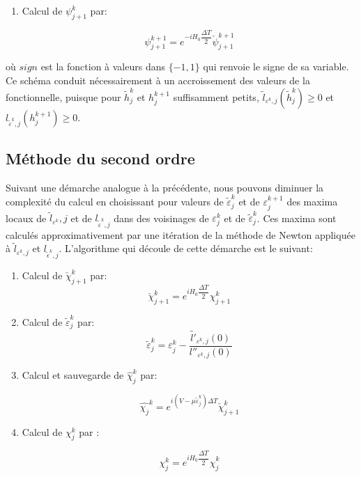 \begin{itemize}
\begin{enumerate}
	\item Calcul de $\psi_{j+1}^k$ par: 
	
	$$\psi_{j+1}^{k+1} = e^{-i H_0 \dfrac{\Delta T}{2}} \check{\psi}_{j+1}^{k+1}$$
	
\end{enumerate}
\end{itemize}

où $sign$ est la fonction à valeurs dans $\{-1,1\}$ qui renvoie le signe de sa variable. Ce schéma conduit nécessairement à un accroissement des valeurs de la fonctionnelle, puisque pour $\tilde{h}_j^k$ et $h_j^{k+1}$ suffisamment petits, $\tilde{l}_{\varepsilon^k,j}(\tilde{h}_j^k) \geq 0$ et $l_{\tilde{\varepsilon}^k,j}(h_j^{k+1})\geq0$.


\subsection{Méthode du second ordre}

Suivant une démarche analogue à la précédente, nous pouvons diminuer la complexité du calcul en choisissant pour valeurs de $\tilde{\varepsilon}_j^k$ et de $\varepsilon_j^{k+1}$ des maxima locaux de $\tilde{l}_{\varepsilon^k},j$ et de $l_{\tilde{\varepsilon}^k,j}$ dans des voisinages de $\varepsilon_j^k$ et de $\tilde{\varepsilon}_j^k$. Ces maxima sont calculés approximativement par une itération de la méthode de Newton appliquée à $\tilde{l}_{\varepsilon^k, j}$ et $l_{\tilde{\epsilon}^k,j}$. L'algorithme qui découle de cette démarche est le suivant:

\begin{enumerate}
	\item Calcul de $\check{\chi}_{j+1}^k$ par: $$ \check{\chi}_{j+1}^k = e^{iH_0 \dfrac{\Delta T}{2}} \chi_{j+1}^k$$
	
	
	\item Calcul de $\tilde{\varepsilon}_j^k$ par: $$\tilde{\varepsilon}_j^k = \varepsilon_j^k - \dfrac{\tilde{l'}_{\varepsilon^k,j}(0)}{l''_{\varepsilon^k,j}(0)}$$
	
	\item Calcul et sauvegarde de $\widehat{\chi}_j^k$ par:
	
	$$\widehat{\chi_j}^k = e^{i(V-\mu \tilde{\varepsilon}_j^k)\Delta T} \check{\chi}_{j+1}^k$$
	\item Calcul de $\chi_j^k$ par :
	
	$$\chi_j^k = e^{i H_0 \dfrac{\Delta T}{2}}\widehat{\chi}_j^k$$
\end{enumerate}


